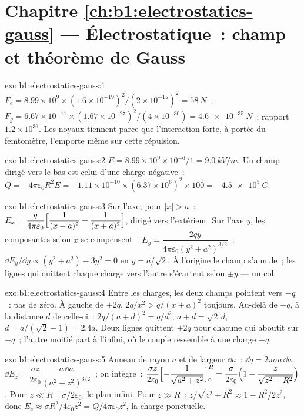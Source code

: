 \section*{Chapitre \ref{ch:b1:electrostatics-gauss} --- Électrostatique~: champ et théorème de Gauss}

\begin{solution}{exo:b1:electrostatics-gauss:1}
$F_e = 8.99 \times 10^9 \times (1.6 \times 10^{-19})^2/(2 \times 10^{-15})^2 = \qty{58}{N}$~;
$F_g = 6.67 \times 10^{-11} \times (1.67 \times 10^{-27})^2/(4 \times 10^{-30}) =
\qty{4.6e-35}{N}$~; rapport $1.2 \times 10^{36}$. Les noyaux tiennent parce que
l'interaction forte, à portée du femtomètre, l'emporte même sur cette répulsion.
\end{solution}

\begin{solution}{exo:b1:electrostatics-gauss:2}
$E = 8.99 \times 10^9 \times 10^{-6}/1 = \qty{9.0}{kV/m}$. Un champ dirigé vers
le bas est celui d'une charge négative~: $Q = -4\pi\varepsilon_0R^2E = -1.11 \times 10^{-10} \times
(6.37 \times 10^6)^2 \times 100 = \qty{-4.5e5}{C}$.
\end{solution}

\begin{solution}{exo:b1:electrostatics-gauss:3}
Sur l'axe, pour $|x| > a$~: $E_x = \dfrac{q}{4\pi\varepsilon_0}\Bigl[\dfrac{1}{(x - a)^2} +
\dfrac{1}{(x + a)^2}\Bigr]$, dirigé vers l'extérieur. Sur l'axe $y$, les
composantes selon $x$ se compensent~: $E_y = \dfrac{2qy}{4\pi\varepsilon_0(y^2 + a^2)^{3/2}}$~; $\dd E_y/\dd y \propto
(y^2 + a^2) - 3y^2 = 0$ en $y = a/\sqrt2$. À l'origine le champ s'annule~; les
lignes qui quittent chaque charge vers l'autre s'écartent selon
$\pm y$ --- un col.
\end{solution}

\begin{solution}{exo:b1:electrostatics-gauss:4}
Entre les charges, les deux champs pointent vers $-q$~: pas de zéro. À gauche
de $+2q$, $2q/x^2 > q/(x + a)^2$ toujours. Au-delà de $-q$, à la distance $d$
de celle-ci~: $2q/(a + d)^2 = q/d^2$, $a + d = \sqrt2\,d$, $d = a/(\sqrt2 - 1) = 2.4a$.
Deux lignes quittent $+2q$ pour chacune qui aboutit sur $-q$~; l'autre moitié
part à l'infini, où le couple ressemble à une charge $+q$.
\end{solution}

\begin{solution}{exo:b1:electrostatics-gauss:5}
Anneau de rayon $a$ et de largeur $\dd a$~: $\dd q = 2\pi\sigma a\,\dd a$, $\dd E_z =
\dfrac{\sigma z}{2\varepsilon_0}\dfrac{a\,\dd a}{(a^2 + z^2)^{3/2}}$~; on intègre~:
$\dfrac{\sigma z}{2\varepsilon_0}\Bigl[-\dfrac{1}{\sqrt{a^2 + z^2}}\Bigr]_0^R = \dfrac{\sigma}{2\varepsilon_0}
\Bigl(1 - \dfrac{z}{\sqrt{z^2 + R^2}}\Bigr)$. Pour $z \ll R$~: $\sigma/2\varepsilon_0$, le
plan infini. Pour $z \gg R$~: $z/\sqrt{z^2 + R^2} \approx 1 - R^2/2z^2$, donc $E_z
\approx \sigma R^2/4\varepsilon_0z^2 = Q/4\pi\varepsilon_0z^2$, la charge ponctuelle.
\end{solution}

